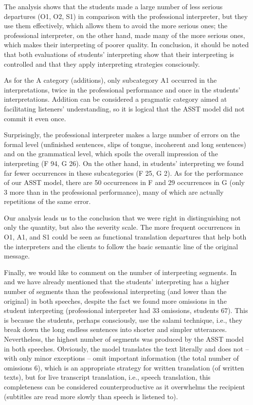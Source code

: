 \documentclass[output=paper]{langscibook}
\begin{document}
The analysis shows that the students made a large number of less serious departures (O1, O2, S1) in comparison with the professional interpreter, but they use them effectively, which allows them to avoid the more serious ones; the professional interpreter, on the other hand, made many of the more serious ones, which makes their interpreting of poorer quality. In conclusion, it should be noted that both evaluations of students’ interpreting show that their interpreting is controlled and that they apply interpreting strategies consciously.

As for the A category (additions), only subcategory A1 occurred in the interpretations, twice in the professional performance and once in the students’ interpretations. Addition can be considered a pragmatic category aimed at facilitating listeners’ understanding, so it is logical that the ASST model did not commit it even once.

Surprisingly, the professional interpreter makes a large number of errors on the formal level (unfinished sentences, slips of tongue, incoherent and long sentences) and on the grammatical level, which spoils the overall impression of the interpreting (F 94, G 26). On the other hand, in students’ interpreting we found far fewer occurrences in these subcategories (F 25, G 2). As for the performance of our ASST model, there are 50 occurrences in F and 29 occurrences in G (only 3 more than in the professional performance), many of which are actually repetitions of the same error.

Our analysis leads us to the conclusion that we were right in distinguishing not only the quantity, but also the severity scale. The more frequent occurrences in O1, A1, and S1 could be seen as functional translation departures that help both the interpreters and the clients to follow the basic semantic line of the original message.

Finally, we would like to comment on the number of interpreting segments. In  and  we have already mentioned that the students’ interpreting has a higher number of segments than the professional interpreting (and lower than the original) in both speeches, despite the fact we found more omissions in the student interpreting (professional interpreter had 33 omissions, students 67). This is because the students, perhaps consciously, use the salami technique, i.e., they break down the long endless sentences into shorter and simpler utterances. Nevertheless, the highest number of segments was produced by the ASST model in both speeches. Obviously, the model translates the text literally and does not – with only minor exceptions – omit important information (the total number of omissions 6), which is an appropriate strategy for written translation (of written texts), but for live transcript translation, i.e., speech translation, this completeness can be considered counterproductive as it overwhelms the recipient (subtitles are read more slowly than speech is listened to).
\end{document}
